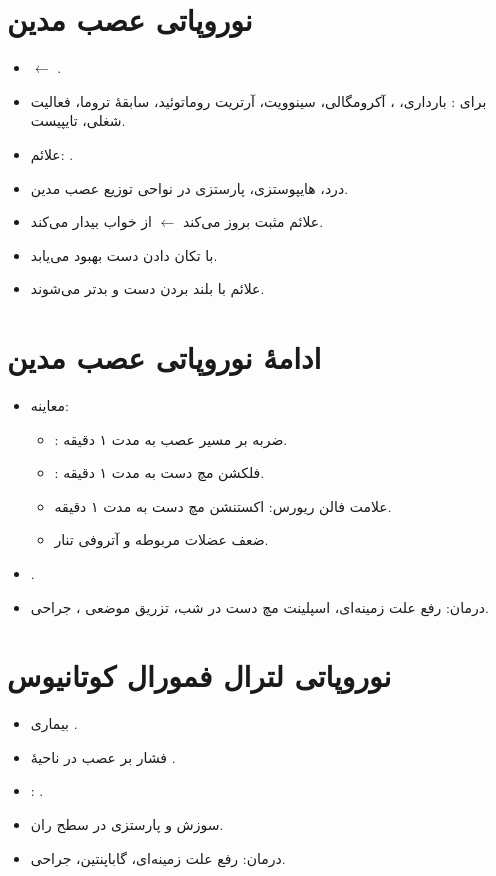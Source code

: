 \documentclass[a4paper,12pt]{extbook}
\begin{document}
\section*{نوروپاتی عصب مدین}
\begin{itemize}
\item {} $\longleftarrow$ .
\item {} برای : بارداری، ، آکرومگالی، سینوویت، آرتریت روماتوئید، سابقهٔ تروما، فعالیت شغلی، تایپیست.
\item علائم: .
\item درد، هایپوستزی، پارستزی در نواحی توزیع عصب مدین.
\item علائم مثبت بروز می‌کند $\longleftarrow$ از خواب بیدار می‌کند.
\item با تکان دادن دست بهبود می‌یابد.
\item علائم با بلند بردن دست و  بدتر می‌شوند.
\end{itemize}

\section*{ادامهٔ نوروپاتی عصب مدین}
\begin{itemize}
\item معاینه:
\begin{itemize}
\item {}: ضربه بر مسیر عصب به مدت ۱ دقیقه.
\item {}: فلکشن مچ دست به مدت ۱ دقیقه.
\item علامت فالن ریورس: اکستنشن مچ دست به مدت ۱ دقیقه.
\item ضعف عضلات مربوطه و آتروفی تنار.
\end{itemize}
\item {}.
\item درمان: رفع علت زمینه‌ای، اسپلینت مچ دست در شب، تزریق موضعی ، جراحی.
\end{itemize}
\section*{نوروپاتی لترال فمورال کوتانیوس}
\begin{itemize}
\item بیماری .
\item فشار بر عصب در ناحیهٔ .
\item {}: .
\item سوزش و پارستزی در سطح  ران.
\item درمان: رفع علت زمینه‌ای، گاباپنتین، جراحی.
\end{itemize}
\end{document}
